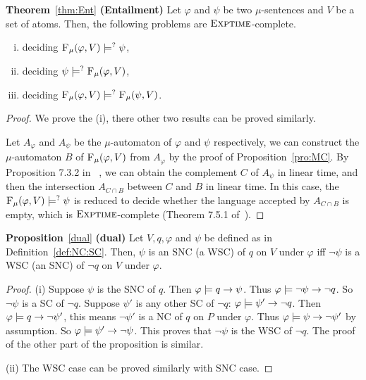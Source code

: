 \documentclass[runningheads]{llncs}
\begin{document}
\noindent\textbf{Theorem}~\ref{thm:Ent} \textbf{(Entailment)}
Let $\varphi$ and $\psi$ be two $\mu$-sentences and $V$ be a set of atoms. Then, the following problems are $\textsc{Exptime}$-complete.
\begin{enumerate}[(i)]
  \item deciding  ${\textsc{F}_{\textsc{$\mu$}}}(\varphi, V ) \models^? \psi$,
  \item deciding  $\psi \models^? {\textsc{F}_{\textsc{$\mu$}}}(\varphi, V)$,
  \item deciding ${\textsc{F}_{\textsc{$\mu$}}}(\varphi, V) \models^? {\textsc{F}_{\textsc{$\mu$}}}(\psi, V)$.
\end{enumerate}
\begin{proof}
We prove the (i), there other two results can be proved similarly.

Let $A_{\varphi}$ and $A_{\psi}$ be the $\mu$-automaton of $\varphi$ and $\psi$ respectively, we can construct the $\mu$-automaton $B$ of ${\textsc{F}_{\textsc{$\mu$}}}(\varphi, V )$ from $A_{\varphi}$ by the proof of Proposition~\ref{pro:MC}. By Proposition 7.3.2 in~\cite{comon1997tree}
, we can obtain the complement $C$ of $A_\psi$ in linear time, and then the intersection $A_{C \cap B}$ between $C$ and $B$  in linear time. In this case, the ${\textsc{F}_{\textsc{$\mu$}}}(\varphi, V ) \models^? \psi$ is reduced to decide whether the language accepted by $A_{C \cap B}$ is empty, which is $\textsc{Exptime}$-complete (Theorem 7.5.1 of~\cite{comon1997tree}).
\end{proof}


\noindent\textbf{Proposition}~\ref{dual} \textbf{(dual)} Let $V,q,\varphi$ and $\psi$ be defined as in Definition~\ref{def:NC:SC}.
 Then, $\psi$ is an SNC (a WSC) of $q$ on $V$ under $\varphi$ iff $\neg \psi$ is a WSC (an SNC)
    of $\neg q$ on $V$ under $\varphi$.
\begin{proof}
     (i) Suppose $\psi$ is the SNC of $q$. Then $\varphi \models q \rightarrow \psi$. Thus $\varphi \models \neg \psi \rightarrow \neg q$. So $\neg \psi$ is a
SC of $\neg q$. Suppose $\psi'$ is any other SC of $\neg q$: $\varphi \models \psi' \rightarrow \neg q$. Then $\varphi \models q \rightarrow \neg \psi'$, this means $\neg \psi'$ is a NC of $q$ on $P$ under $\varphi$.
Thus $\varphi \models \psi \rightarrow \neg \psi'$ by assumption. So $\varphi \models \psi' \rightarrow \neg \psi$. This proves that $\neg \psi$ is the WSC of $\neg q$.
The proof of the other part of the proposition is similar.

(ii) The WSC case can be proved similarly with SNC case.
    \end{proof}
\end{document}
